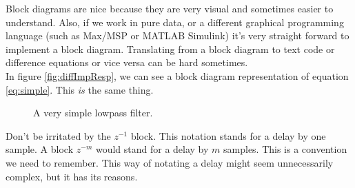 Block diagrams are nice because they are very visual and sometimes easier to understand. Also, if we work in pure data, or a different graphical programming language (such as Max/MSP or MATLAB Simulink) it's very straight forward to implement a block diagram. Translating from a block diagram to text code or difference equations or vice versa can be hard sometimes.\\
In figure \ref{fig:diffImpResp}, we can see a block diagram representation of equation \ref{eq:simple}. This \textit{is} the same thing.


\begin{figure}[H]
  \centering
  \label{fig:string}
  \caption{A very simple lowpass filter.}
  \label{fig:blockDiagr}
\end{figure}

Don't be irritated by the $z^{-1}$ block. This notation stands for a delay by one sample. A block $z^{-m}$ would stand for a delay by $m$ samples. This is a convention we need to remember. This way of notating a delay might seem unnecessarily complex, but it has its reasons.

